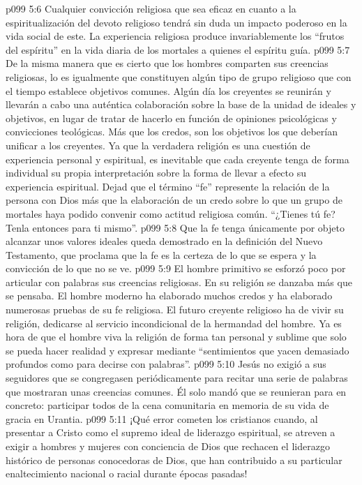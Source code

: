 \vs p099 5:6 Cualquier convicción religiosa que sea eficaz en cuanto a la espiritualización del devoto religioso tendrá sin duda un impacto poderoso en la vida social de este. La experiencia religiosa produce invariablemente los “frutos del espíritu” en la vida diaria de los mortales a quienes el espíritu guía.
\vs p099 5:7 De la misma manera que es cierto que los hombres comparten sus creencias religiosas, lo es igualmente que constituyen algún tipo de grupo religioso que con el tiempo establece objetivos comunes. Algún día los creyentes se reunirán y llevarán a cabo una auténtica colaboración sobre la base de la unidad de ideales y objetivos, en lugar de tratar de hacerlo en función de opiniones psicológicas y convicciones teológicas. Más que los credos, son los objetivos los que deberían unificar a los creyentes. Ya que la verdadera religión es una cuestión de experiencia personal y espiritual, es inevitable que cada creyente tenga de forma individual su propia interpretación sobre la forma de llevar a efecto su experiencia espiritual. Dejad que el término “fe” represente la relación de la persona con Dios más que la elaboración de un credo sobre lo que un grupo de mortales haya podido convenir como actitud religiosa común. “¿Tienes tú fe? Tenla entonces para ti mismo”.
\vs p099 5:8 Que la fe tenga únicamente por objeto alcanzar unos valores ideales queda demostrado en la definición del Nuevo Testamento, que proclama que la fe es la certeza de lo que se espera y la convicción de lo que no se ve.
\vs p099 5:9 El hombre primitivo se esforzó poco por articular con palabras sus creencias religiosas. En su religión se danzaba más que se pensaba. El hombre moderno ha elaborado muchos credos y ha elaborado numerosas pruebas de su fe religiosa. El futuro creyente religioso ha de vivir su religión, dedicarse al servicio incondicional de la hermandad del hombre. Ya es hora de que el hombre viva la religión de forma tan personal y sublime que solo se pueda hacer realidad y expresar mediante “sentimientos que yacen demasiado profundos como para decirse con palabras”.
\vs p099 5:10 Jesús no exigió a sus seguidores que se congregasen periódicamente para recitar una serie de palabras que mostraran unas creencias comunes. Él solo mandó que se reunieran para  en concreto: participar todos de la cena comunitaria en memoria de su vida de gracia en Urantia.
\vs p099 5:11 \pc ¡Qué error cometen los cristianos cuando, al presentar a Cristo como el supremo ideal de liderazgo espiritual, se atreven a exigir a hombres y mujeres con conciencia de Dios que rechacen el liderazgo histórico de personas conocedoras de Dios, que han contribuido a su particular enaltecimiento nacional o racial durante épocas pasadas!
